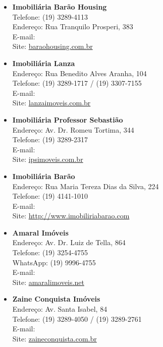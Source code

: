 \begin{itemize}
    \item   \textbf{Imobiliária Barão Housing}
        \\Telefone: (19) 3289-4113
        \\Endereço: Rua Tranquilo Prosperi, 383
        \\E-mail: 
        \\Site: \url{baraohousing.com.br}

    \item   \textbf{Imobiliária Lanza}
        \\Endereço: Rua Benedito Alves Aranha, 104
        \\Telefone: (19) 3289-1717 / (19) 3307-7155
        \\E-mail: 
        \\Site: \url{lanzaimoveis.com.br}

    \item   \textbf{Imobiliária Professor Sebastião}
        \\Endereço: Av. Dr. Romeu Tortima, 344
        \\Telefone: (19) 3289-2317
        \\E-mail: 
        \\Site: \url{ipsimoveis.com.br}

    \item   \textbf{Imobiliária Barão}
        \\Endereço: Rua Maria Tereza Dias da Silva, 224
        \\Telefone: (19) 4141-1010
        \\E-mail: 
        \\Site: \url{http://www.imobiliriabarao.com}

    \item   \textbf{Amaral Imóveis}
        \\Endereço: Av. Dr. Luiz de Tella, 864
        \\Telefone: (19) 3254-4755
        \\WhatsApp: (19) 9996-4755
        \\E-mail: 
        \\Site: \url{amaralimoveis.net}

    \item   \textbf{Zaine Conquista Imóveis}
        \\Endereço: Av. Santa Isabel, 84
        \\Telefone: (19) 3289-4050 / (19) 3289-2761
        \\E-mail: 
        \\Site: \url{zaineconquista.com.br}


\end{itemize}
